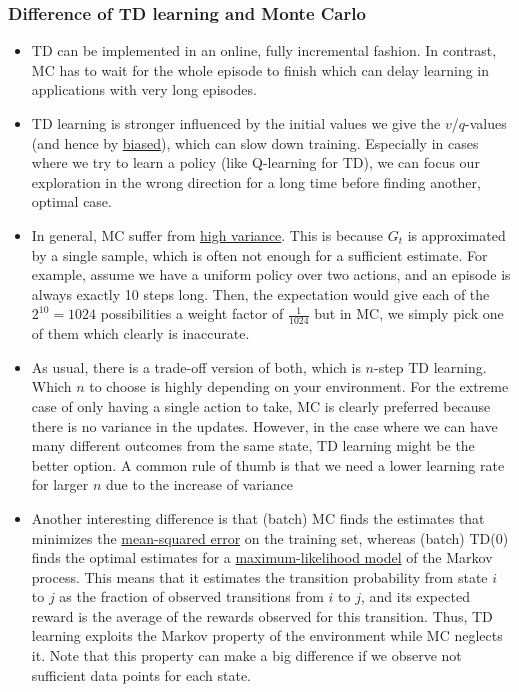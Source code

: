 \subsubsection{Difference of TD learning and Monte Carlo}
\label{sec:value_based_tabular_difference_TD_MC}
\begin{itemize}
	\item TD can be implemented in an online, fully incremental fashion. In contrast, MC has to wait for the whole episode to finish which can delay learning in applications with very long episodes.
	\item TD learning is stronger influenced by the initial values we give the $v$/$q$-values (and hence by \underline{biased}), which can slow down training. Especially in cases where we try to learn a policy (like Q-learning for TD), we can focus our exploration in the wrong direction for a long time before finding another, optimal case.
	\item In general, MC suffer from \underline{high variance}. This is because $G_t$ is approximated by a single sample, which is often not enough for a sufficient estimate. For example, assume we have a uniform policy over two actions, and an episode is always exactly 10 steps long. Then, the expectation would give each of the $2^{10}=1024$ possibilities a weight factor of $\frac{1}{1024}$ but in MC, we simply pick one of them which clearly is inaccurate.
	\item As usual, there is a trade-off version of both, which is $n$-step TD learning. Which $n$ to choose is highly depending on your environment. For the extreme case of only having a single action to take, MC is clearly preferred because there is no variance in the updates. However, in the case where we can have many different outcomes from the same state, TD learning might be the better option. A common rule of thumb is that we need a lower learning rate for larger $n$ due to the increase of variance
	\item Another interesting difference is that (batch) MC finds the estimates that minimizes the \underline{mean-squared error} on the training set, whereas (batch) TD(0) finds the optimal estimates for a \underline{maximum-likelihood model} of the Markov process. This means that it estimates the transition probability from state $i$ to $j$ as the fraction of observed transitions from $i$ to $j$, and its expected reward is the average of the rewards observed for this transition. Thus, TD learning exploits the Markov property of the environment while MC neglects it. Note that this property can make a big difference if we observe not sufficient data points for each state.
\end{itemize}

